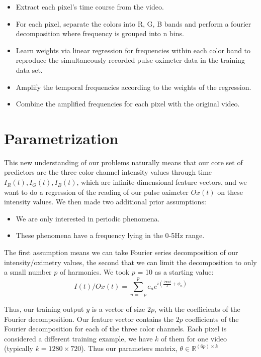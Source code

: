 \documentclass[12pt]{article}
\begin{document}
  \begin{itemize}
    \item Extract each pixel’s time course from the video. 
\item For each pixel, separate the colors into R, G, B bands and perform a fourier decomposition where frequency is grouped into n bins.
\item Learn weights via linear regression for frequencies within each color band to reproduce the simultaneously recorded pulse oximeter data in the training data set. 
    \item Amplify the temporal frequencies according to the weights of the regression.
    \item Combine the amplified frequencies for each pixel with the original video.
  \end{itemize}


  


\section{Parametrization}
  This new understanding of our problems naturally means that our core set of predictors are the three color channel intensity values through
  time \(I_R(t), I_G(t), I_B(t)\), which are infinite-dimensional feature vectors, and we want to do a regression of the reading of our pulse oximeter $Ox(t)$ 
  on these intensity values.
  We then made two additional prior assumptions:
  \begin{itemize}
    \item We are only interested in periodic phenomena.
    \item These phenomena have a frequency lying in the 0-5Hz range.
  \end{itemize}

  The first assumption means we can take Fourier series decomposition of our intensity/oximetry values, the second that we can
  limit the decomposition to only a small number $p$ of harmonics. We took $p$ = 10 as a starting value:
  \[
    I(t)/Ox(t) = \sum_{n=-p}^{p} c_n e^{i \left(\frac{2\pi nt}{T}  + \phi_n \right) }
  \]

  Thus, our training output $y$ is a vector of size $2p$, with the coefficients of the Fourier decomposition.
  Our feature vector contains the $2p$ coefficients of the Fourier decomposition for each of the three color channels.
  Each pixel is considered a different training example, we have $k$ of them for one video (typically \(k=1280\times 720\)).
  Thus our parameters matrix, $\theta \in \mathbb{R}^{(6p) \times k}$
\end{document}
